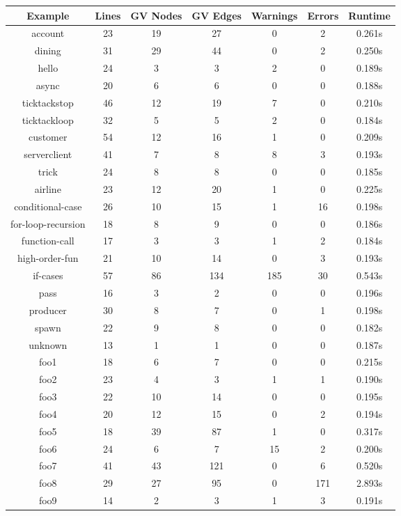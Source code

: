 \begin{table}[!ht]
\centering
\begin{tabular}{|c|c|c|c|c|c|c|}
\hline
Example & Lines & GV Nodes & GV Edges & Warnings & Errors & Runtime \\ 
\hline
account & 23 & 19 & 27 & 0 & 2 & 0.261s \\ 
dining & 31 & 29 & 44 & 0 & 2 & 0.250s \\ 
hello & 24 & 3 & 3 & 2 & 0 & 0.189s \\ 
async & 20 & 6 & 6 & 0 & 0 & 0.188s \\ 
ticktackstop & 46 & 12 & 19 & 7 & 0 & 0.210s \\ 
ticktackloop & 32 & 5 & 5 & 2 & 0 & 0.184s \\ 
customer & 54 & 12 & 16 & 1 & 0 & 0.209s \\ 
serverclient & 41 & 7 & 8 & 8 & 3 & 0.193s \\ 
trick & 24 & 8 & 8 & 0 & 0 & 0.185s \\ 
airline & 23 & 12 & 20 & 1 & 0 & 0.225s \\ 
conditional-case & 26 & 10 & 15 & 1 & 16 & 0.198s \\ 
for-loop-recursion & 18 & 8 & 9 & 0 & 0 & 0.186s \\ 
function-call & 17 & 3 & 3 & 1 & 2 & 0.184s \\ 
high-order-fun & 21 & 10 & 14 & 0 & 3 & 0.193s \\ 
if-cases & 57 & 86 & 134 & 185 & 30 & 0.543s \\ 
pass & 16 & 3 & 2 & 0 & 0 & 0.196s \\ 
producer & 30 & 8 & 7 & 0 & 1 & 0.198s \\ 
spawn & 22 & 9 & 8 & 0 & 0 & 0.182s \\ 
unknown & 13 & 1 & 1 & 0 & 0 & 0.187s \\ 
foo1 & 18 & 6 & 7 & 0 & 0 & 0.215s \\ 
foo2 & 23 & 4 & 3 & 1 & 1 & 0.190s \\ 
foo3 & 22 & 10 & 14 & 0 & 0 & 0.195s \\ 
foo4 & 20 & 12 & 15 & 0 & 2 & 0.194s \\ 
foo5 & 18 & 39 & 87 & 1 & 0 & 0.317s \\ 
foo6 & 24 & 6 & 7 & 15 & 2 & 0.200s \\ 
foo7 & 41 & 43 & 121 & 0 & 6 & 0.520s \\ 
foo8 & 29 & 27 & 95 & 0 & 171 & 2.893s \\ 
foo9 & 14 & 2 & 3 & 1 & 3 & 0.191s \\ 

\end{tabular}
\end{table}
